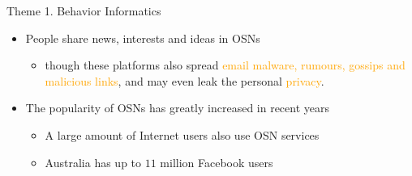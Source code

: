 \documentclass[
 size=14pt,
 paper=smartboard,  %
 mode=present, 		%
 display=slides, 	%
 style=tuliplab,  	%
 pauseslide,
 fleqn,leqno]{powerdot}{}
\begin{document}
\begin{slide}{Theme 1. Behavior Informatics}
\begin{itemize}
\item
People share \textcolor{blue!50}{news, interests}
and \textcolor{blue!50}{ideas} in OSNs

\begin{itemize}
\item
though these platforms also spread
\textcolor{orange}{email malware, rumours, gossips}
\textcolor{orange}{and malicious links},
and may even leak the personal \textcolor{orange}{privacy}.
\end{itemize}

\item The popularity of OSNs has greatly increased in recent years

\begin{itemize}
\item
A large amount of Internet users also use OSN services

\item
Australia has up to $11$ million Facebook users
\end{itemize}


\end{itemize}
%
%
\end{slide}
\end{document}
